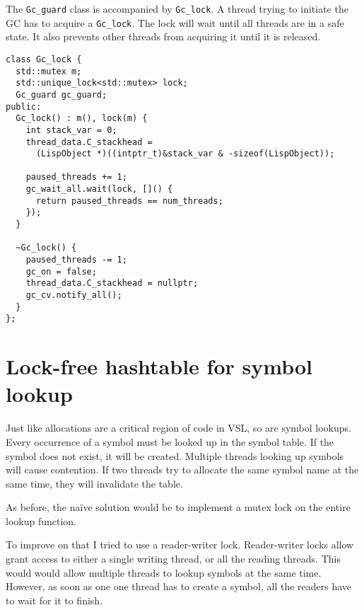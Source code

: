 The \texttt{Gc\_guard} class is accompanied by \texttt{Gc\_lock}. A thread trying to initiate the GC has to
acquire a \texttt{Gc\_lock}. The lock will wait until all threads are in a safe state. It also prevents
other threads from acquiring it until it is released.

\begin{verbatim}
class Gc_lock {
  std::mutex m;
  std::unique_lock<std::mutex> lock;
  Gc_guard gc_guard;
public:
  Gc_lock() : m(), lock(m) {
    int stack_var = 0;
    thread_data.C_stackhead =
      (LispObject *)((intptr_t)&stack_var & -sizeof(LispObject));

    paused_threads += 1;
    gc_wait_all.wait(lock, []() {
      return paused_threads == num_threads;
    });
  }

  ~Gc_lock() {
    paused_threads -= 1;
    gc_on = false;
    thread_data.C_stackhead = nullptr;
    gc_cv.notify_all();
  }
};
\end{verbatim}


\section{Lock-free hashtable for symbol lookup}
\label{sec:hashtable}
Just like allocations are a critical region of code in VSL, so are symbol lookups.
Every occurrence of a symbol must be looked up in the symbol table. If the symbol does
not exist, it will be created. Multiple threads looking up symbols will cause contention.
If two threads try to allocate the same symbol name at the same time, they will invalidate
the table.

As before, the na\"ive solution would be to implement a mutex lock on the entire
lookup function.

To improve on that I tried to use a reader-writer lock. Reader-writer locks allow grant access
to either a single writing thread, or all the reading threads. This would would allow multiple
threads to lookup symbols at the same time. However, as soon as one one thread has to create a
symbol, all the readers have to wait for it to finish.


